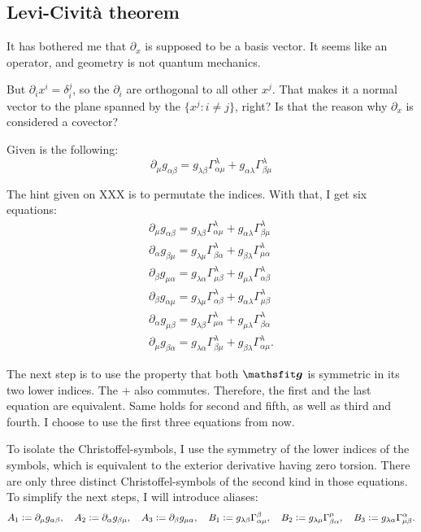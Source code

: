 \subsection{Levi-Cività theorem}

\begin{aside}
    It has bothered me that $\partial_x$ is supposed to be a basis vector. It
    seems like an operator, and geometry is not quantum mechanics.

    But $\partial_i x^i = \delta^j_i$, so the $\partial_i$ are orthogonal to
    all other $x^j$. That makes it a normal vector to the plane spanned by the
    $\{ x^j \colon i \neq j \}$, right? Is that the reason why $\partial_x$ is
    considered a covector?
\end{aside}

\newcommand\equ[3]{\partial_{#1} g_{{#2}{#3}} = g_{\lambda{#3}} \Gamma^\lambda_{{#2}{#1}} + g_{{#2}\lambda} \Gamma^\lambda_{{#3}{#1}}}

Given is the following:
\[
    \equ\mu\alpha\beta
\]

The hint given on XXX is to permutate the indices. With that, I get six
equations:
\begin{gather*}
    \equ\mu\alpha\beta \\
    \equ\alpha\beta\mu \\
    \equ\beta\mu\alpha \\
    \equ\beta\alpha\mu \\
    \equ\alpha\mu\beta \\
    \equ\mu\beta\alpha.
\end{gather*}

The next step is to use the property that both $\tens g$ is symmetric in its
two lower indices. The $+$ also commutes. Therefore, the first and the last
equation are equivalent. Same holds for second and fifth, as well as third and
fourth. I choose to use the first three equations from now.

To isolate the Christoffel-symbols, I use the symmetry of the lower indices of
the symbols, which is equivalent to the exterior derivative having zero
torsion. There are only three distinct Christoffel-symbols of the second kind
in those equations. To simplify the next steps, I will introduce aliases:
\[
    A_1 := \partial_\mu g_{\alpha\beta}
    ,\quad
    A_2 := \partial_\alpha g_{\beta\mu}
    ,\quad
    A_3 := \partial_\beta g_{\mu\alpha}
    ,\quad
    B_1 := g_{\lambda\beta} \Gamma^{\beta}_{{\alpha}{\mu}}
    ,\quad
    B_2 := g_{\lambda\mu} \Gamma^{\mu}_{{\beta}{\alpha}}
    ,\quad
    B_3 := g_{\lambda\alpha} \Gamma^{\alpha}_{{\mu}{\beta}}.
\]

